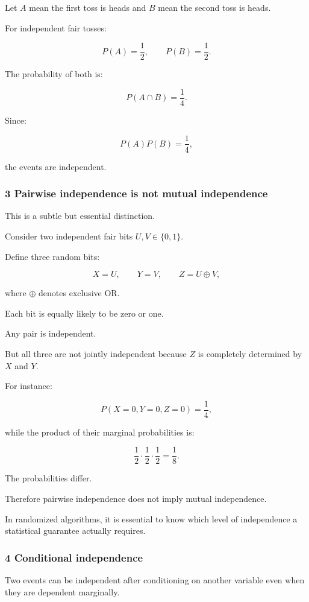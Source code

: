 Let \(A\) mean the first toss is heads and \(B\) mean the second toss is heads.

For independent fair tosses:

\[
 P(A)=\frac12, \qquad P(B)=\frac12.
\]

The probability of both is:

\[
 P(A\cap B)=\frac14.
\]

Since:

\[
 P(A)P(B)=\frac14,
\]

the events are independent.

\subsubsection{3 Pairwise independence is not mutual independence}\label{02-foundations-ii-ch023-pairwise-independence-is-not-mutual-independence}

This is a subtle but essential distinction.

Consider two independent fair bits \(U,V\in\{0,1\}\).

Define three random bits:

\[
 X=U, \qquad Y=V, \qquad Z=U\oplus V,
\]

where \(\oplus\) denotes exclusive OR.

Each bit is equally likely to be zero or one.

Any pair is independent.

But all three are not jointly independent because \(Z\) is completely determined by \(X\) and \(Y\).

For instance:

\[
 P(X=0,Y=0,Z=0)=\frac14,
\]

while the product of their marginal probabilities is:

\[
 \frac12\cdot\frac12\cdot\frac12=\frac18.
\]

The probabilities differ.

Therefore pairwise independence does not imply mutual independence.

In randomized algorithms, it is essential to know which level of independence a statistical guarantee actually requires.

\subsubsection{4 Conditional independence}\label{02-foundations-ii-ch023-conditional-independence}

Two events can be independent after conditioning on another variable even when they are dependent marginally.

